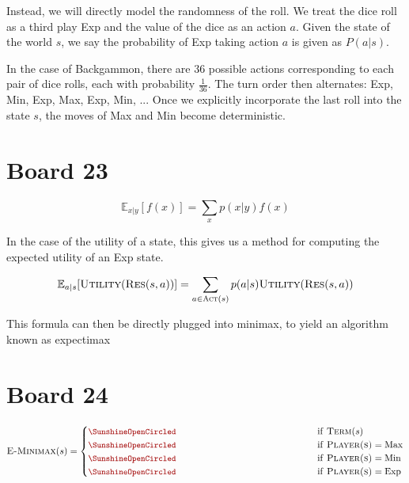 \documentclass[11pt]{article}
\begin{document}
Instead, we will directly model the randomness of the roll. We treat the dice roll as a third play Exp and the value of the dice as an action $a$. Given the state of the world $s$, we say the probability of Exp taking action $a$ is given as $P(a | s)$. 

In the case of Backgammon, there are $36$ possible actions corresponding to each pair of dice rolls, each with probability $\frac{1}{36}$. The turn order then alternates: Exp, Min, Exp, Max, Exp, Min, ...
Once we explicitly incorporate the last roll into the state $s$, the moves of Max and Min become deterministic.  


\section{Board 23}

\[\mathbb{E}_{x|y}[f(x)] = \sum_{x} p(x|y)f(x) \]

In the case of the utility of a state, this gives us a method for computing the expected utility of an Exp state.




\[ \mathbb{E}_{a|s}[\mathrm{\textsc{Utility}}(\mathrm{\textsc{Res}}(s, a))]= \sum_{a \in \mathrm{\textsc{Act}}(s) } p(a | s) \mathrm{\textsc{Utility}}(\mathrm{\textsc{Res}}(s, a))  \]  

This formula can then be directly plugged into minimax, to yield an algorithm known as expectimax

\section{Board 24}

\[ \msc{E-Minimax}(s) = \begin{cases} 
  \censorm{\msc{Utility}(s)} & \mathrm{if\ } \msc{Term}(s)  \\
  \censorm{\max_{a \in \msc{Act}(s) } \msc{E-Minimax}(\msc{Res}(s, a))} & \mathrm{if\ } \msc{Player(s)} = \mathrm{Max}  \\
  \censorm{\min_{a \in \msc{Act}(s) } \msc{E-Minimax}(\msc{Res}(s, a))} & \mathrm{if\ } \msc{Player(s)} = \mathrm{Min} \\ 
  \censorm{\sum_{a \in \msc{Act}(s) } p(a | s) \msc{E-Minimax}(\msc{Res}(s, a))} & \mathrm{if\ } \msc{Player(s)} = \mathrm{Exp} \end{cases}\] 
\end{document}
